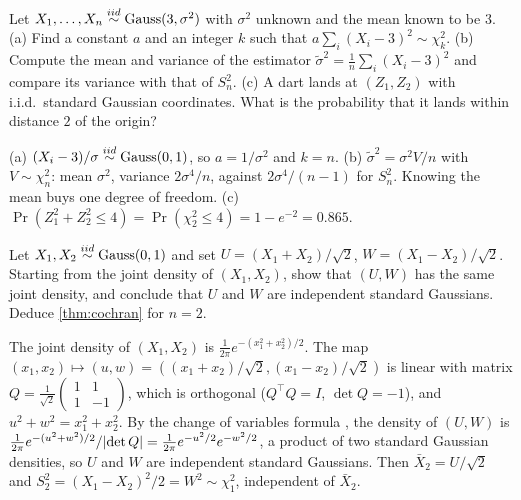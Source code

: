 \begin{exercise}
\label{ex:t-chisq-moments}
Let $X_1, \ldots, X_n \stackrel{iid}{\sim} \text{Gauss}(3, \sigma^2)$ with $\sigma^2$ unknown and the mean known to be $3$. (a) Find a constant $a$ and an integer $k$ such that $a\sum_i (X_i - 3)^2 \sim \chi^2_k$. (b) Compute the mean and variance of the estimator $\tilde{\sigma}^2 = \frac1n\sum_i(X_i - 3)^2$ and compare its variance with that of $S_n^2$. (c) A dart lands at $(Z_1, Z_2)$ with i.i.d.\ standard Gaussian coordinates. What is the probability that it lands within distance $2$ of the origin?
\end{exercise}
\begin{solution}
(a) $(X_i - 3)/\sigma \stackrel{iid}{\sim} \text{Gauss}(0,1)$, so $a = 1/\sigma^2$ and $k = n$. (b) $\tilde{\sigma}^2 = \sigma^2 V/n$ with $V \sim \chi^2_n$: mean $\sigma^2$, variance $2\sigma^4/n$, against $2\sigma^4/(n-1)$ for $S_n^2$. Knowing the mean buys one degree of freedom. (c) $\Pr(Z_1^2 + Z_2^2 \leq 4) = \Pr(\chi^2_2 \leq 4) = 1 - e^{-2} = 0.865$.
\end{solution}

\begin{exercise}
\label{ex:t-cochran-two}
Let $X_1, X_2 \stackrel{iid}{\sim} \text{Gauss}(0, 1)$ and set $U = (X_1 + X_2)/\sqrt{2}$, $W = (X_1 - X_2)/\sqrt{2}$. Starting from the joint density of $(X_1, X_2)$, show that $(U, W)$ has the same joint density, and conclude that $U$ and $W$ are independent standard Gaussians. Deduce \cref{thm:cochran} for $n = 2$.
\end{exercise}
\begin{solution}
The joint density of $(X_1, X_2)$ is $\frac{1}{2\pi}e^{-(x_1^2 + x_2^2)/2}$. The map $(x_1, x_2) \mapsto (u, w) = ((x_1 + x_2)/\sqrt{2}, (x_1 - x_2)/\sqrt{2})$ is linear with matrix $Q = \frac{1}{\sqrt{2}}\begin{pmatrix} 1 & 1 \\ 1 & -1\end{pmatrix}$, which is orthogonal ($Q^\top Q = I$, $\det Q = -1$), and $u^2 + w^2 = x_1^2 + x_2^2$. By the change of variables formula , the density of $(U, W)$ is $\frac{1}{2\pi}e^{-(u^2 + w^2)/2}/\lvert\det Q\rvert = \frac{1}{2\pi}e^{-u^2/2}e^{-w^2/2}$, a product of two standard Gaussian densities, so $U$ and $W$ are independent standard Gaussians. Then $\bar{X}_2 = U/\sqrt{2}$ and $S_2^2 = (X_1 - X_2)^2/2 = W^2 \sim \chi^2_1$, independent of $\bar{X}_2$.
\end{solution}

